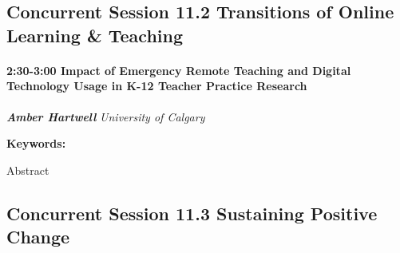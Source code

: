 \documentclass[
]{book}
\begin{document}
\hypertarget{concurrent-session-11.2-transitions-of-online-learning-teaching}{%
\subsection*{Concurrent Session 11.2 \textbar{} Transitions of Online Learning \& Teaching}\label{concurrent-session-11.2-transitions-of-online-learning-teaching}}

\begin{session}
\hypertarget{impact-of-emergency-remote-teaching-and-digital-technology-usage-in-k-12-teacher-practice-research}{%
\paragraph*{\texorpdfstring{2:30-3:00 \textbar{} \textbf{Impact of
Emergency Remote Teaching and Digital Technology Usage in K-12 Teacher
Practice} \textbar{}
Research}{2:30-3:00 \textbar{} Impact of Emergency Remote Teaching and Digital Technology Usage in K-12 Teacher Practice \textbar{} Research}}\label{impact-of-emergency-remote-teaching-and-digital-technology-usage-in-k-12-teacher-practice-research}}

\textbf{\emph{Amber Hartwell}} \textbar{} \emph{University of Calgary}

\textbf{Keywords:}

Abstract
\end{session}

\hypertarget{concurrent-session-11.3-sustaining-positive-change}{%
\subsection*{Concurrent Session 11.3 \textbar{} Sustaining Positive Change}\label{concurrent-session-11.3-sustaining-positive-change}}
\end{document}
